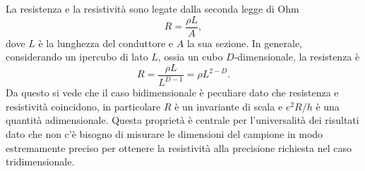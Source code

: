 La resistenza e la resistività sono legate dalla seconda legge di Ohm 
\begin{equation}
    R = \frac{\rho L}{A},
\end{equation}
dove $L$ è la lunghezza del conduttore e $A$ la sua sezione. In generale, considerando un ipercubo di lato $L$, ossia un cubo $D$-dimensionale, la resistenza è 
\begin{equation}
    R = \frac{\rho L}{L^{D - 1}} = \rho L^{2 - D}.
\end{equation}
Da questo si vede che il caso bidimensionale è peculiare dato che resistenza e resistività coincidono, in particolare $R$ è un invariante di scala e $e^2R/h$ è una quantità adimensionale. Questa proprietà è centrale per l'universalità dei risultati dato che non c'è bisogno di misurare le dimensioni del campione in modo estremamente preciso per ottenere la resistività alla precisione richiesta nel caso tridimensionale.

